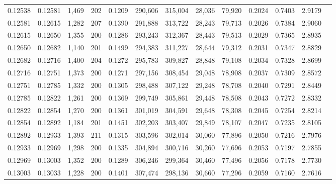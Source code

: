 \begin{tabular}{rrrrrrrrrrrrr}
0.12538 & 0.12581 & 1,469 & 202 &                                     0.1209 & 290,606 & 315,004 &  28,036 &  79,920 & 0.2024 & 0.7403 & 2.9179 \\
0.12581 & 0.12615 & 1,282 & 207 &                                     0.1390 & 291,888 & 313,722 &  28,243 &  79,713 & 0.2026 & 0.7384 & 2.9060 \\
0.12615 & 0.12650 & 1,355 & 200 &                                     0.1286 & 293,243 & 312,367 &  28,443 &  79,513 & 0.2029 & 0.7365 & 2.8935 \\
0.12650 & 0.12682 & 1,140 & 201 &                                     0.1499 & 294,383 & 311,227 &  28,644 &  79,312 & 0.2031 & 0.7347 & 2.8829 \\
0.12682 & 0.12716 & 1,400 & 204 &                                     0.1272 & 295,783 & 309,827 &  28,848 &  79,108 & 0.2034 & 0.7328 & 2.8699 \\
0.12716 & 0.12751 & 1,373 & 200 &                                     0.1271 & 297,156 & 308,454 &  29,048 &  78,908 & 0.2037 & 0.7309 & 2.8572 \\
0.12751 & 0.12785 & 1,332 & 200 &                                     0.1305 & 298,488 & 307,122 &  29,248 &  78,708 & 0.2040 & 0.7291 & 2.8449 \\
0.12785 & 0.12822 & 1,261 & 200 &                                     0.1369 & 299,749 & 305,861 &  29,448 &  78,508 & 0.2043 & 0.7272 & 2.8332 \\
0.12822 & 0.12854 & 1,270 & 200 &                                     0.1361 & 301,019 & 304,591 &  29,648 &  78,308 & 0.2045 & 0.7254 & 2.8214 \\
0.12854 & 0.12892 & 1,184 & 201 &                                     0.1451 & 302,203 & 303,407 &  29,849 &  78,107 & 0.2047 & 0.7235 & 2.8105 \\
0.12892 & 0.12933 & 1,393 & 211 &                                     0.1315 & 303,596 & 302,014 &  30,060 &  77,896 & 0.2050 & 0.7216 & 2.7976 \\
0.12933 & 0.12969 & 1,298 & 200 &                                     0.1335 & 304,894 & 300,716 &  30,260 &  77,696 & 0.2053 & 0.7197 & 2.7855 \\
0.12969 & 0.13003 & 1,352 & 200 &                                     0.1289 & 306,246 & 299,364 &  30,460 &  77,496 & 0.2056 & 0.7178 & 2.7730 \\
0.13003 & 0.13033 & 1,228 & 200 &                                     0.1401 & 307,474 & 298,136 &  30,660 &  77,296 & 0.2059 & 0.7160 & 2.7616 \\

\end{tabular}
